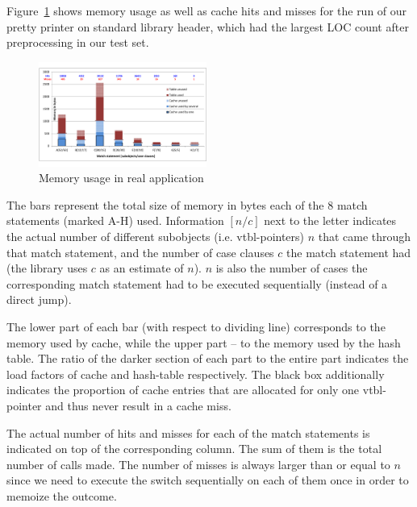 Figure~\ref{fig:mem} shows memory usage as well as cache hits and misses for 
the run of our pretty printer on  standard library 
header, which had the largest LOC count after preprocessing in our test set.

\begin{figure}[htbp]
  \centering
    \includegraphics[width=0.49\textwidth]{Memory.pdf}
  \caption{Memory usage in real application}
  \label{fig:mem}
\end{figure}

The bars represent the total size of memory in bytes each of the 8 match 
statements (marked A-H) used. Information $[n/c]$ next to the letter indicates the 
actual number of different subobjects (i.e. vtbl-pointers) $n$ that came through 
that match statement, and the number of case clauses $c$ the match statement had 
(the library uses $c$ as an estimate of $n$). $n$ is also the number of cases the 
corresponding match statement had to be executed sequentially (instead of a 
direct jump).

The lower part of each bar (with respect to dividing line) corresponds to the memory used by cache, while the 
upper part -- to the memory used by the hash table. The ratio of the darker
section of each part to the entire part indicates the load factors 
of cache and hash-table respectively. The black box additionally indicates the 
proportion of cache entries that are allocated for only one vtbl-pointer and 
thus never result in a cache miss. %

The actual number of hits and misses for each of the match statements is 
indicated on top of the corresponding column. The sum of them is the total 
number of calls made. %
The number of misses is always larger than or equal to $n$ since we need to 
execute the switch sequentially on each of them once in order to memoize the 
outcome.

